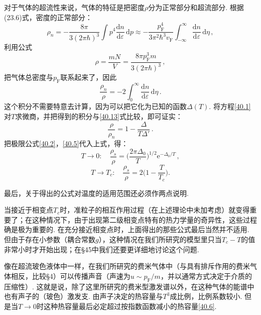 对于气体的超流性来说，气体的特征是把密度$\rho$分为正常部分和超流部分. 根据(23.6)式，密度的正常部分：
\begin{equation*}
\rho_n = -\frac{8\pi}{3(2\pi\hbar)^3}\int p^4\frac{\mathrm dn}{\mathrm d\varepsilon}\,\mathrm dp
\approx -\frac{p_{\mathrm F}^4}{3\pi^2\hbar^3v_{\mathrm F}}\int_{-\infty}^{\infty}\frac{\mathrm dn}{\mathrm d\varepsilon}\,\mathrm d\eta\,,
\end{equation*}
利用公式
\begin{equation*}
\rho = \frac{mN}{V} = \frac{8\pi p_{\mathrm F}^3m}{3(2\pi\hbar)^3}\,,
\end{equation*}
把气体总密度与$p_{\mathrm F}$联系起来了，因此
\begin{equation}
\frac{\rho_n}{\rho} = -2\int_0^{\infty}\frac{\mathrm dn}{\mathrm d\varepsilon}\,\mathrm d\eta\,.
\label{40.13}
\end{equation}
这个积分不需要特意去计算，因为可以把它化为已知的函数$\Delta(T)$. 将方程\eqref{40.1}对$T$求微商，并把得到的积分与\eqref{40.13}式比较，即可证实：
\begin{equation}
\frac{\rho}{\rho_n} = 1 - \frac{\Delta}{T\Delta'}\,.
\label{40.14}
\end{equation}
把极限公式\eqref{40.2}，\eqref{40.5}代入上式，得：
\begin{equation}
T\to 0:\quad \frac{\rho_s}{\rho} = \Biggl(\frac{2\pi\Delta_0}{T}\Biggr)^{1/2}\mathrm e^{-\Delta_0/T}\,,
\label{40.15}
\end{equation}
\begin{equation}
T\to T_c:\quad \frac{\rho_s}{\rho} = 2\Biggl(1-\frac{T}{T_c}\Biggr).
\label{40.16}
\end{equation}

最后，关于得出的公式对温度的适用范围还必须作两点说明.

当接近于相变点$T_c$时，准粒子的相互作用过程（在上述理论中未加考虑）就变得重要了；在这种情况下，由于出现第二级相变点特有的热力学量的奇异性，这些过程确是极为重要的. 在充分接近相变点时，上面得出的那些公式最后当然并不适用. 但由于存在小参数（耦合常数$g$），这种情况在我们所研究的模型里只当$T_c-T$的值非常小时才开始出现；在§45中我们还要更详细地讨论这个问题.

像在超流玻色液体中一样，在我们所研究的费米气体中（与具有排斥作用的费米气体相反，比较§4）可以传播声音（声速为$u\sim p_{\mathrm F}/m$，并以通常方式决定于介质的压缩性）. 这就是说，除了这里所研究的费米型激发谱以外，在这种气体的能谱中也有声子的（玻色）激发支. 由声子决定的热容量与$T^3$成比例，比例系数较小. 但是当$T\to0$时这种热容量最后必定超过按指数函数减小的热容量\eqref{40.6}.


